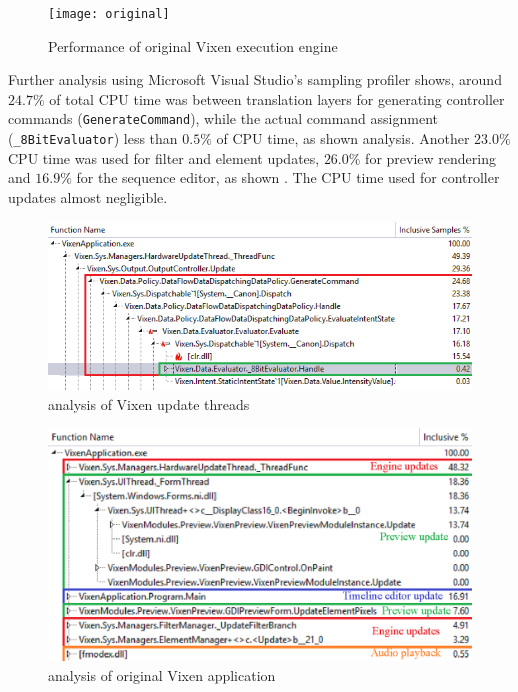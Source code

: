 \begin{figure}[t]
  \centering
  \texttt{[image: original]}
  \caption{\footnotesize Performance of original Vixen execution engine}
  \label{fig:original}
\end{figure}

Further analysis using Microsoft Visual Studio's sampling profiler shows, around $24.7 \%$ of total CPU time was  between translation layers for generating controller commands (\texttt{GenerateCommand}), while the actual command assignment (\texttt{\_8BitEvaluator})  less than $0.5 \%$ of CPU time, as shown    analysis. Another $23.0 \%$ CPU time was used for filter and element updates, $26.0 \%$ for preview rendering and $16.9 \%$ for the sequence editor, as shown  . The CPU time used for controller updates  almost negligible.

\begin{figure}[t]
  \centering
  \includegraphics[width=0.85\columnwidth]{Figs/vixen_perf_original.png}
  \caption{\footnotesize {} analysis of Vixen update threads}
  \label{fig:vixen_perf_original}
\end{figure}

\begin{figure}[t]
  \centering
  \includegraphics[width=0.85\columnwidth]{Figs/vixen_perf_original_overview.eps}
  \caption{\footnotesize {} analysis of original Vixen application}
  \label{fig:vixen_perf_original_overview}
\end{figure}

